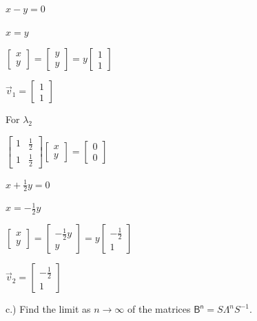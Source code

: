 \documentclass[answers, a4paper, 11pt]{exam}
\newcommand{\mat}[1]{\boldsymbol { \mathsf{#1}} }
\begin{document}
\begin{enumerate}
\begin{solution}
$x - y = 0$

$x = y$

$\begin{bmatrix}
x \\ y 
\end{bmatrix} = \begin{bmatrix}
y \\ y 
\end{bmatrix} = y\begin{bmatrix}
1 \\ 1 
\end{bmatrix}$

$\vec v_1 = \begin{bmatrix}
1 \\ 1 
\end{bmatrix}$

For $\lambda_2$

$
\begin{bmatrix}
1 & \frac{1}{2} \\ 1 & \frac{1}{2} 
\end{bmatrix}
\begin{bmatrix}
x \\ y
\end{bmatrix}
= \begin{bmatrix}
0 \\ 0
\end{bmatrix}
$

$x + \frac{1}{2}y = 0$

$x = -\frac{1}{2}y$

$
\begin{bmatrix}
x \\ y
\end{bmatrix} =
\begin{bmatrix}
-\frac{1}{2}y \\ y
\end{bmatrix} = y 
\begin{bmatrix}
-\frac{1}{2} \\ 1
\end{bmatrix}
$

$\vec   v_2 = 
\begin{bmatrix}
-\frac{1}{2} \\ 1
\end{bmatrix}
$



\end{solution}

c.) Find the limit as $n \rightarrow \infty$ of the matrices $\mat{B^n} = S \Lambda ^{n}S^{-1}$.


\end{enumerate}
\end{document}
